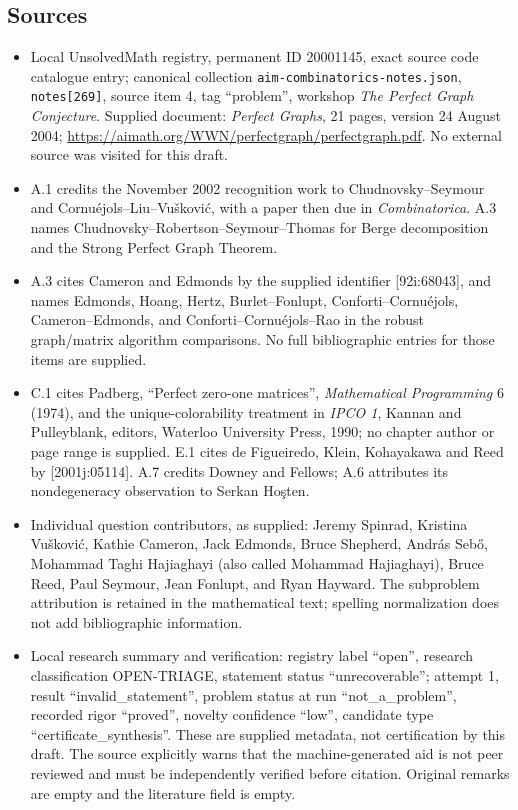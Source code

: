 \documentclass[11pt]{article}
\begin{document}
\subsection{Sources}
\begin{itemize}
\item Local UnsolvedMath registry, permanent ID 20001145, exact source code catalogue entry; canonical collection \texttt{aim-combinatorics-notes.json}, \texttt{notes[269]}, source item 4, tag ``problem'', workshop \emph{The Perfect Graph Conjecture}. Supplied document: \emph{Perfect Graphs}, 21 pages, version 24 August 2004; \url{https://aimath.org/WWN/perfectgraph/perfectgraph.pdf}. No external source was visited for this draft.
\item A.1 credits the November 2002 recognition work to Chudnovsky--Seymour and Cornu\'ejols--Liu--Vu\v{s}kovi\'c, with a paper then due in \emph{Combinatorica}. A.3 names Chudnovsky--Robertson--Seymour--Thomas for Berge decomposition and the Strong Perfect Graph Theorem.
\item A.3 cites Cameron and Edmonds by the supplied identifier [92i:68043], and names Edmonds, Hoang, Hertz, Burlet--Fonlupt, Conforti--Cornu\'ejols, Cameron--Edmonds, and Conforti--Cornu\'ejols--Rao in the robust graph/matrix algorithm comparisons. No full bibliographic entries for those items are supplied.
\item C.1 cites Padberg, ``Perfect zero-one matrices'', \emph{Mathematical Programming} 6 (1974), and the unique-colorability treatment in \emph{IPCO 1}, Kannan and Pulleyblank, editors, Waterloo University Press, 1990; no chapter author or page range is supplied. E.1 cites de Figueiredo, Klein, Kohayakawa and Reed by [2001j:05114]. A.7 credits Downey and Fellows; A.6 attributes its nondegeneracy observation to Serkan Ho\c{s}ten.
\item Individual question contributors, as supplied: Jeremy Spinrad, Kristina Vu\v{s}kovi\'c, Kathie Cameron, Jack Edmonds, Bruce Shepherd, Andr\'as Seb\H{o}, Mohammad Taghi Hajiaghayi (also called Mohammad Hajiaghayi), Bruce Reed, Paul Seymour, Jean Fonlupt, and Ryan Hayward. The subproblem attribution is retained in the mathematical text; spelling normalization does not add bibliographic information.
\item Local research summary and verification: registry label ``open'', research classification OPEN-TRIAGE, statement status ``unrecoverable''; attempt 1, result ``invalid\_statement'', problem status at run ``not\_a\_problem'', recorded rigor ``proved'', novelty confidence ``low'', candidate type ``certificate\_synthesis''. These are supplied metadata, not certification by this draft. The source explicitly warns that the machine-generated aid is not peer reviewed and must be independently verified before citation. Original remarks are empty and the literature field is empty.
\end{itemize}
\end{document}
